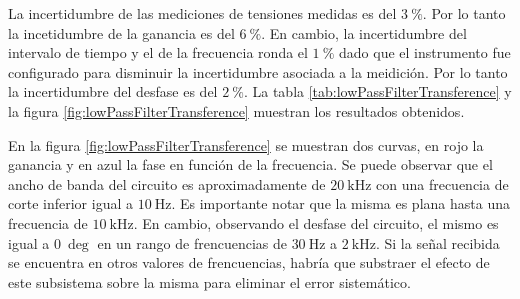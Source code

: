 La incertidumbre de las mediciones de tensiones medidas es del $\SI{3}{\percent}$. Por lo tanto la incetidumbre de la ganancia es del $\SI{6}{\percent}$. En cambio, la incertidumbre del intervalo de tiempo y el de la frecuencia ronda el $\SI{1}{\percent}$ dado que el instrumento fue configurado para disminuir la incertidumbre asociada a la meidición. Por lo tanto la incertidumbre del desfase es del $\SI{2}{\percent}$. La tabla \ref{tab:lowPassFilterTransference} y la figura \ref{fig:lowPassFilterTransference} muestran los resultados obtenidos.

En la figura \ref{fig:lowPassFilterTransference} se muestran dos curvas, en rojo la ganancia y en azul la fase en función de la frecuencia. Se puede observar que el ancho de banda del circuito es aproximadamente de $\SI{20}{\kHz}$ con una frecuencia de corte inferior igual a $\SI{10}{\Hz}$. Es importante notar que la misma es plana hasta una frecuencia de $\SI{10}{\kHz}$. En cambio, observando el desfase del circuito, el mismo es igual a $\SI{0}{\deg}$ en un rango de frencuencias de $\SI{30}{\Hz}$ a $\SI{2}{\kHz}$. Si la señal recibida se encuentra en otros valores de frencuencias, habría que substraer el efecto de este subsistema sobre la misma para eliminar el error sistemático.

